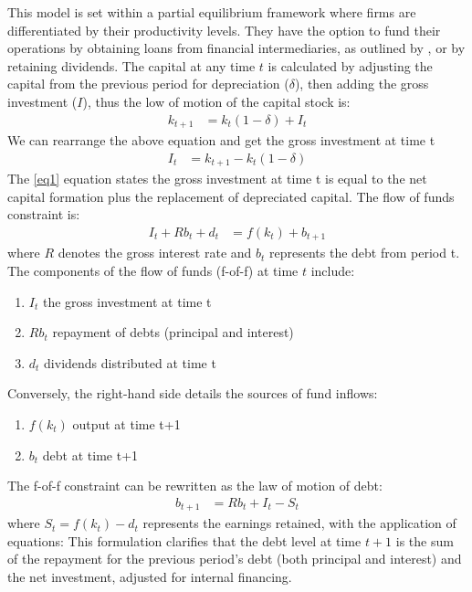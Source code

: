 \documentclass[12pt]{report}
\begin{document}
This model is set within a partial equilibrium framework where firms are differentiated by their productivity levels.
They have the option to fund their operations by obtaining loans from financial intermediaries, as outlined by
\cite{bernanke1995inside}, or by retaining dividends. The capital at any time \(t\) is calculated by
adjusting the capital from the previous period for depreciation (\(\delta\)), then adding the gross investment (\(I\)), thus the
low of motion of the capital stock is: 
\begin{align*}
    k_{t+1} &= k_{t}(1 - \delta)  + I_t  
\end{align*} 
We can rearrange  the above equation and get the gross investment at time t
\begin{align}
    I_t &= k_{t+1} - k_{t}\left(1-\delta\right) \label{eq1}
\end{align} 
The \ref{eq1} equation states the gross investment at time t is equal to the net capital formation plus the replacement
of depreciated capital. 
The flow of funds constraint is:
\begin{align}
    I_t + R b_{t} + d_t &= f(k_t) + b_{t+1} \label{eq2}
\end{align}
where \(R\) denotes the gross interest rate and \(b_{t}\) represents the debt from period t.
The components of the flow of funds (f-of-f) at time \(t\) include:
\begin{enumerate}
    \item \(I_t\) the gross investment at time t
    \item \(R b_{t}\) repayment of debts (principal and interest) 
    \item \(d_t\) dividends distributed at time t
\end{enumerate}

Conversely, the right-hand side details the sources of fund inflows:
\begin{enumerate}
    \item \(f(k_{t}) \) output at time t+1
    \item  \(b_t\) debt at time t+1
\end{enumerate}

The f-of-f constraint can be rewritten as the law of motion of debt: 
\begin{align} 
    b_{t+1} &= R b_{t} + I_{t} - S_{t}  \label{eq2'}
\end{align} 
where \(S_{t} = f(k_{t}) -
d_t\) represents the earnings  retained, with the application of equations:
This formulation clarifies that the debt level at time \(t+1\) is the sum of the repayment for the previous period's debt
(both principal and interest) and the net investment, adjusted for internal financing.
\end{document}
